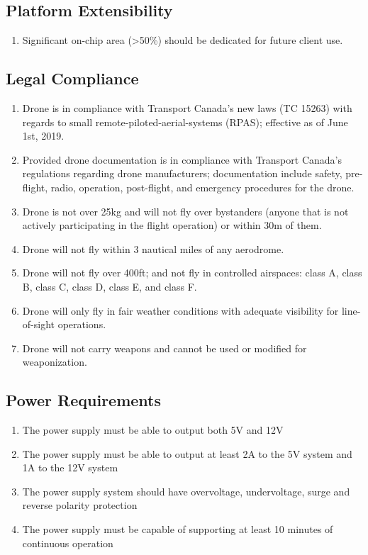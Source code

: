 \documentclass[10pt,letterpaper]{article}
\begin{document}
\subsection{Platform Extensibility}
\begin{enumerate}[{C.PE}.1:]
    \item Significant on-chip area (>50\%) should be dedicated for future client use.
\end{enumerate}

\subsection{Legal Compliance}
\begin{enumerate}[{C.LG}.1:]
    \item Drone is in compliance with Transport Canada's new laws (TC 15263) with regards to small remote-piloted-aerial-systems (RPAS); effective as of June 1st, 2019.
    \item Provided drone documentation is in compliance with Transport Canada's regulations regarding drone manufacturers; documentation include safety, pre-flight, radio, operation, post-flight, and emergency procedures for the drone.
    \item Drone is not over 25kg and will not fly over bystanders (anyone that is not actively participating in the flight operation) or within 30m of them.
    \item Drone will not fly within 3 nautical miles of any aerodrome.
    \item Drone will not fly over 400ft; and not fly in controlled airspaces: class A, class B, class C, class D, class E, and class F.
    \item Drone will only fly in fair weather conditions with adequate visibility for line-of-sight operations.
    \item Drone will not carry weapons and cannot be used or modified for weaponization.
\end{enumerate}

\subsection{Power Requirements}
\begin{enumerate}[{C.EN}.1:]
    \item The power supply must be able to output both 5V and 12V
    \item The power supply must be able to output at least 2A to the 5V system and 1A to the 12V system
    \item The power supply system should have overvoltage, undervoltage, surge and reverse polarity protection
    \item The power supply must be capable of supporting at least 10 minutes of continuous operation

\end{enumerate}
\end{document}
